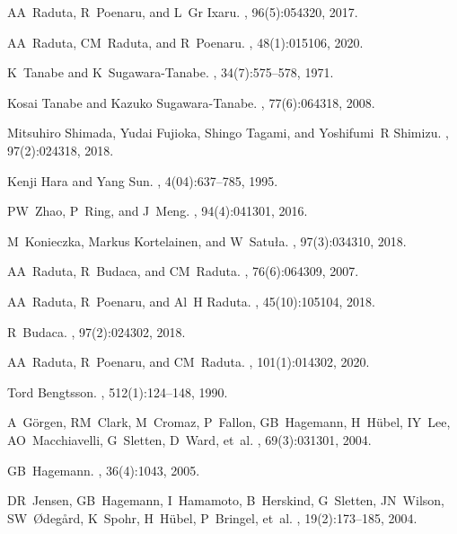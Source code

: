\documentclass[myclassdoc,debug]{rjparticle}
\begin{document}
\begin{thebibliography}{99}
AA~Raduta, R~Poenaru, and L~Gr Ixaru.
, 96(5):054320, 2017.

AA~Raduta, CM~Raduta, and R~Poenaru.
,
  48(1):015106, 2020.

K~Tanabe and K~Sugawara-Tanabe.
, 34(7):575--578, 1971.

Kosai Tanabe and Kazuko Sugawara-Tanabe.
, 77(6):064318, 2008.

Mitsuhiro Shimada, Yudai Fujioka, Shingo Tagami, and Yoshifumi~R Shimizu.
, 97(2):024318, 2018.

Kenji Hara and Yang Sun.
, 4(04):637--785,
  1995.

PW~Zhao, P~Ring, and J~Meng.
, 94(4):041301, 2016.

M~Konieczka, Markus Kortelainen, and W~Satu{\l}a.
, 97(3):034310, 2018.

AA~Raduta, R~Budaca, and CM~Raduta.
, 76(6):064309, 2007.

AA~Raduta, R~Poenaru, and Al~H Raduta.
,
  45(10):105104, 2018.

R~Budaca.
, 97(2):024302, 2018.

AA~Raduta, R~Poenaru, and CM~Raduta.
, 101(1):014302, 2020.

Tord Bengtsson.
, 512(1):124--148, 1990.

A~G{\"o}rgen, RM~Clark, M~Cromaz, P~Fallon, GB~Hagemann, H~H{\"u}bel, IY~Lee,
  AO~Macchiavelli, G~Sletten, D~Ward, et~al.
, 69(3):031301, 2004.

GB~Hagemann.
, 36(4):1043, 2005.

DR~Jensen, GB~Hagemann, I~Hamamoto, B~Herskind, G~Sletten, JN~Wilson,
  SW~{\O}deg{\aa}rd, K~Spohr, H~H{\"u}bel, P~Bringel, et~al.
,
  19(2):173--185, 2004.


\end{thebibliography}
\end{document}
